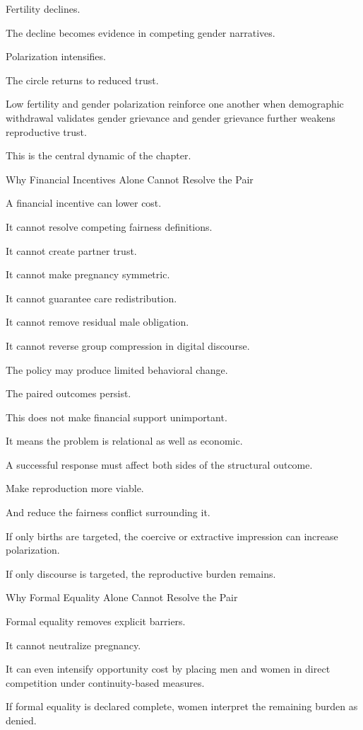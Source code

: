 Fertility declines.

The decline becomes evidence in competing gender narratives.

Polarization intensifies.

The circle returns to reduced trust.

Low fertility and gender polarization reinforce one another when demographic withdrawal validates gender grievance and gender grievance further weakens reproductive trust.

This is the central dynamic of the chapter.

Why Financial Incentives Alone Cannot Resolve the Pair

A financial incentive can lower cost.

It cannot resolve competing fairness definitions.

It cannot create partner trust.

It cannot make pregnancy symmetric.

It cannot guarantee care redistribution.

It cannot remove residual male obligation.

It cannot reverse group compression in digital discourse.

The policy may produce limited behavioral change.

The paired outcomes persist.

This does not make financial support unimportant.

It means the problem is relational as well as economic.

A successful response must affect both sides of the structural outcome.

Make reproduction more viable.

And reduce the fairness conflict surrounding it.

If only births are targeted, the coercive or extractive impression can increase polarization.

If only discourse is targeted, the reproductive burden remains.

Why Formal Equality Alone Cannot Resolve the Pair

Formal equality removes explicit barriers.

It cannot neutralize pregnancy.

It can even intensify opportunity cost by placing men and women in direct competition under continuity-based measures.

If formal equality is declared complete, women interpret the remaining burden as denied.

